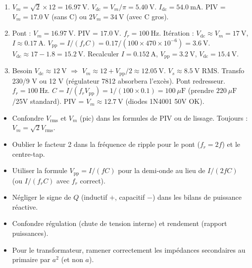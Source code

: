 \documentclass[11pt]{article}
\begin{document}
\begin{corrige}
\begin{enumerate}
\item $V_m = \sqrt{2}\times 12 = 16.97\ \mathrm{V}$. $V_{\mathrm{dc}} = V_m/\pi = 5.40\ \mathrm{V}$. $I_{\mathrm{dc}} = 54.0\ \mathrm{mA}$. PIV = $V_m = 17.0\ \mathrm{V}$ (sans C) ou $2V_m = 34\ \mathrm{V}$ (avec C gros).
\item Pont : $V_m = 16.97\ \mathrm{V}$. PIV = $17.0\ \mathrm{V}$.
$f_r = 100\ \mathrm{Hz}$. Itération : $V_{\mathrm{dc}} \approx V_m = 17\ \mathrm{V}$, $I \approx 0.17\ \mathrm{A}$.
$V_{\mathrm{pp}} = I/(f_r C) = 0.17/(100 \times 470\times10^{-6}) = 3.6\ \mathrm{V}$.
$V_{\mathrm{dc}} \approx 17 - 1.8 = 15.2\ \mathrm{V}$. Recalculer $I = 0.152\ \mathrm{A}$, $V_{\mathrm{pp}} = 3.2\ \mathrm{V}$, $V_{\mathrm{dc}} = 15.4\ \mathrm{V}$.
\item Besoin $V_{\mathrm{dc}} \approx 12\ \mathrm{V}$ $\Rightarrow$ $V_m \approx 12 + V_{\mathrm{pp}}/2 \approx 12.05\ \mathrm{V}$. $V_s \approx 8.5\ \mathrm{V}$ RMS. Transfo 230/9 V ou 12 V (régulateur 7812 absorbera l'excès).
Pont redresseur. $f_r=100\ \mathrm{Hz}$. $C = I/(f_r V_{\mathrm{pp}}) = 1/(100 \times 0.1) = 100\ \mu\mathrm{F}$ (prendre $220\ \mu\mathrm{F}$/25V standard). PIV = $V_m \approx 12.7\ \mathrm{V}$ (diodes 1N4001 50V OK).
\end{enumerate}
\end{corrige}

\begin{attention}
\begin{itemize}
\item Confondre $V_{\mathrm{rms}}$ et $V_m$ (pic) dans les formules de PIV ou de lissage. Toujours : $V_m = \sqrt{2} V_{\mathrm{rms}}$.
\item Oublier le facteur 2 dans la fréquence de ripple pour le pont ($f_r = 2f$) et le centre-tap.
\item Utiliser la formule $V_{\mathrm{pp}} = I/(fC)$ pour la demi-onde au lieu de $I/(2fC)$ (ou $I/(f_r C)$ avec $f_r$ correct).
\item Négliger le signe de $Q$ (inductif $+$, capacitif $-$) dans les bilans de puissance réactive.
\item Confondre régulation (chute de tension interne) et rendement (rapport puissances).
\item Pour le transformateur, ramener correctement les impédances secondaires au primaire par $a^2$ (et non $a$).
\end{itemize}
\end{attention}
\end{document}
